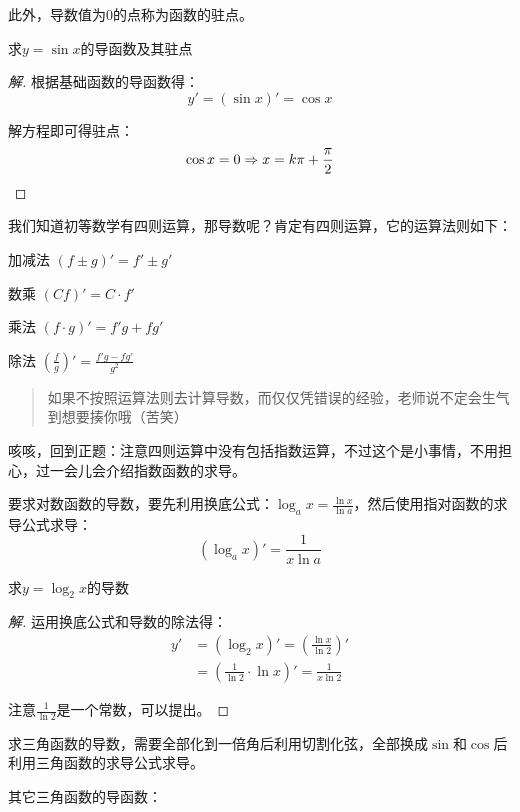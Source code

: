 此外，导数值为$0$的点称为函数的驻点。

\begin{example}
	求$y=\sin x$的导函数及其驻点
\end{example}
\begin{proof}[解]
	根据基础函数的导函数得：\[y'=(\sin x)'=\cos x\]

	解方程即可得驻点：\[\cos x=0\Rightarrow x=k\pi+\frac{\pi}{2}\qedhere\]
\end{proof}

我们知道初等数学有四则运算，那导数呢？肯定有四则运算，它的运算法则如下：

\begin{desclist}
	\item[加减法] $(f\pm g)'=f'\pm g'$
	\item[数乘] $(Cf)'=C\cdot f'$
	\item[乘法] $(f\cdot g)'=f'g+fg'$
	\item[除法] $(\frac{f}{g})'=\frac{f'g-fg'}{g^2}$
\end{desclist}

\begin{quote}
	如果不按照运算法则去计算导数，而仅仅凭错误的经验，老师说不定会生气到想要揍你哦（苦笑）
\end{quote}

咳咳，回到正题：注意四则运算中没有包括指数运算，不过这个是小事情，不用担心，过一会儿会介绍指数函数的求导。

\noindent\dotfill

要求对数函数的导数，要先利用换底公式：$\log_ax=\frac{\ln x}{\ln a}$，然后使用指对函数的求导公式求导：
\[(\log_ax)'=\frac{1}{x\ln a}\]

\begin{example}
	求$y=\log_2x$的导数
\end{example}
\begin{proof}[解]
	运用换底公式和导数的除法得：
	\[\begin{aligned}
		y'&=(\log_2x)'=(\frac{\ln x}{\ln2})' \\
		  &=(\frac{1}{\ln2}\cdot\ln x)'=\frac{1}{x\ln2}
	\end{aligned}\]

	注意$\frac{1}{\ln2}$是一个常数，可以提出。
\end{proof}

\noindent\dotfill

求三角函数的导数，需要全部化到一倍角后利用切割化弦，全部换成$\sin$和$\cos$后利用三角函数的求导公式求导。

其它三角函数的导函数：

